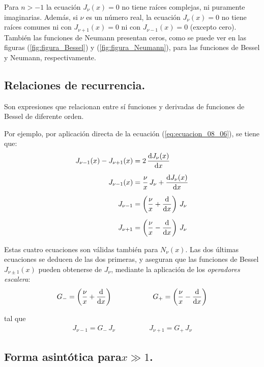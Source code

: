Para $n > -1$ la ecuación $J_{\nu} (x) = 0$ no tiene raíces complejas, ni puramente imaginarias. Además, si $\nu$ es un número real, la ecuación $J_{\nu} (x) = 0$ no tiene raíces comunes ni con $J_{\nu+1} (x) = 0$ ni con $J_{\nu-1} (x) = 0$ (excepto cero). También las funciones de Neumann presentan ceros, como se puede ver en las figuras (\ref{fig:figura_Bessel}) y (\ref{fig:figura_Neumann}), para las funciones de Bessel y Neumann, respectivamente.

\subsection{Relaciones de recurrencia.}

Son expresiones que relacionan entre sí funciones y derivadas de funciones de Bessel de diferente orden.
\par
Por ejemplo, por aplicación directa de la ecuación (\ref{eq:ecuacion_08_06}), se tiene que:
\begin{align*}
J_{\nu-1} (x) - J_{\nu+1} (x)&= 2 \, \dv{J_{\nu}(x)}{x} \\[0.5em]
J_{\nu-1} (x) &= \dfrac{\nu}{x} \, J_{\nu} + \dv{J_{\nu}(x)}{x} \\[0.5em]
J_{\nu-1} &= \left( \dfrac{\nu}{x} + \dv{}{x} \right) \, J_{\nu} \\[0.5em]
J_{\nu+1} &= \left( \dfrac{\nu}{x} - \dv{}{x} \right) \, J_{\nu}
\end{align*}

Estas cuatro ecuaciones son válidas también para $N_{\nu} (x)$. Las dos últimas ecuaciones se deducen de las dos primeras, y aseguran que las funciones de Bessel $J_{\nu \pm 1} (x)$ pueden obtenerse de $J_{\nu}$, mediante la aplicación de los \emph{operadores escalera}:
\begin{align*}
G_{-} = \left( \dfrac{\nu}{x} + \dv{}{x} \right) \hspace{2cm} G_{+} = \left( \dfrac{\nu}{x} - \dv{}{x} \right)
\end{align*}

tal que
\begin{align*}
J_{\nu-1} = G_{-} \, J_{\nu} \hspace{2cm} J_{\nu+1} = G_{+} \, J_{\nu}
\end{align*}

\subsection{Forma asintótica para\texorpdfstring{$x \gg 1$}{x >> 1}.}

